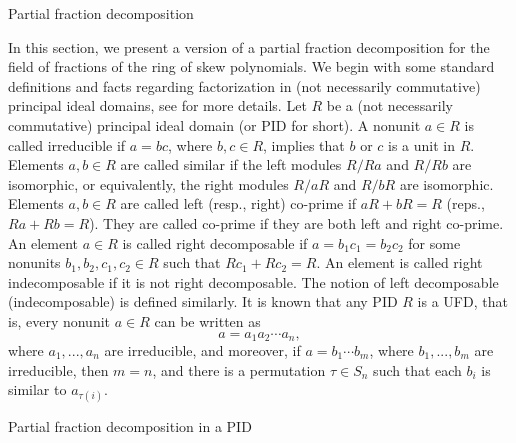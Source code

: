 \documentclass[11pt,a4paper]{article}
\theoremstyle{theorem}
\numberwithin{equation}{section}
\begin{document}
\begin{section}{Partial fraction decomposition}
	
	In this section, we present a version of a partial fraction decomposition for  the field of fractions of the ring of skew polynomials. We begin with some standard definitions and facts regarding factorization in  (not necessarily commutative) principal ideal domains, see \cite{cohn1963noncommutative,cohn1973unique} for more details. Let $R$ be a (not necessarily commutative) principal ideal domain (or PID for short). A nonunit $a\in R$ is called irreducible if $a=bc$, where $b,c\in R$, implies that $b$ or $c$ is a unit in $R$.
	Elements $a,b\in R$ are called similar if the left modules $R/Ra$ and $R/Rb$ are isomorphic, or equivalently, the right modules $R/aR$ and $R/bR$ are isomorphic. Elements $a,b\in R$ are called left (resp., right) co-prime if $aR+bR=R$ (reps., $Ra+Rb=R$). They are called co-prime if they are both left and right co-prime. An element $a\in R$ is called right decomposable if $a=b_1c_1=b_2c_2$ for some nonunits $b_1,b_2,c_1,c_2\in R$ such that $Rc_1+Rc_2=R$. An element is called right indecomposable if it is not right decomposable. The notion of left decomposable (indecomposable) is defined similarly.
	 It is known that any PID $R$ is a UFD, that is, every nonunit $a\in R$ can be written as
	$$a=a_1a_2\cdots a_n,$$ where $a_1,...,a_n$ are irreducible, and moreover, if $a=b_1\cdots b_m$, where $b_1,...,b_m$ are irreducible, then $m=n$, and there is a permutation $\tau\in S_n$ such that each $b_i$ is similar to $a_{\tau(i)}$. 		
	 
	
	
	\begin{subsection}{Partial fraction decomposition in a PID}
		

\end{subsection}
\end{section}
\end{document}
